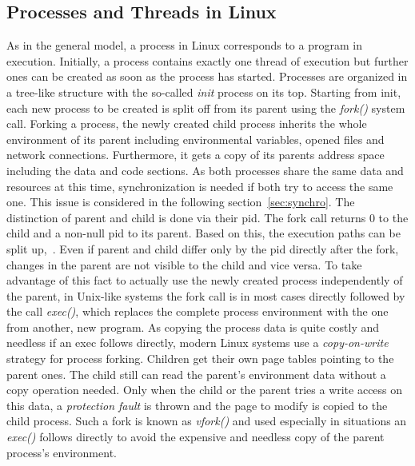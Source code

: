\subsection{Processes and Threads in Linux} 
As in the general model, a process in Linux corresponds to a program in execution.
Initially, a process contains exactly one thread of execution but further ones can be created as soon as the process has started\cite{tanenbaum-modern-operating-systems}.
Processes are organized in a tree-like structure with the so-called \textit{init} process on its top.
Starting from init, each new process to be created is split off from its parent using the \textit{fork()} system call.
Forking a process, the newly created child process inherits the whole environment of its parent including environmental variables, opened files and network connections.
Furthermore, it gets a copy of its parents address space including the data and code sections.
As both processes share the same data and resources at this time, synchronization is needed if both try to access the same one\cite{mandl2014Grundkurs}.
This issue is considered in the following section~\ref{sec:synchro}.
The distinction of parent and child is done via their \ac{pid}.
The fork call returns 0 to the child and a non-null \ac{pid} to its parent. 
Based on this, the execution paths can be split up\cite{tanenbaum-modern-operating-systems},~\cite{mandl2014Grundkurs}.
Even if parent and child differ only by the \ac{pid} directly after the fork, changes in the parent are not visible to the child and vice versa.
To take advantage of this fact to actually use the newly created process independently of the parent, in Unix-like systems the fork call is in most cases directly followed by the call \textit{exec()}, which replaces the complete process environment with the one from another, new program.
As copying the process data is quite costly and needless if an exec follows directly, modern Linux systems use a \textit{copy-on-write} strategy for process forking.
Children get their own page tables pointing to the parent ones.
The child still can read the parent's environment data without a copy operation needed. 
Only when the child or the parent tries a write access on this data, a \textit{protection fault} is thrown and the page to modify is copied to the child process\cite{tanenbaum-modern-operating-systems}.
Such a fork is known as \textit{vfork()} and used especially in situations an \textit{exec()} follows directly to avoid the expensive and needless copy of the parent process's environment\cite{mandl2014Grundkurs}.

